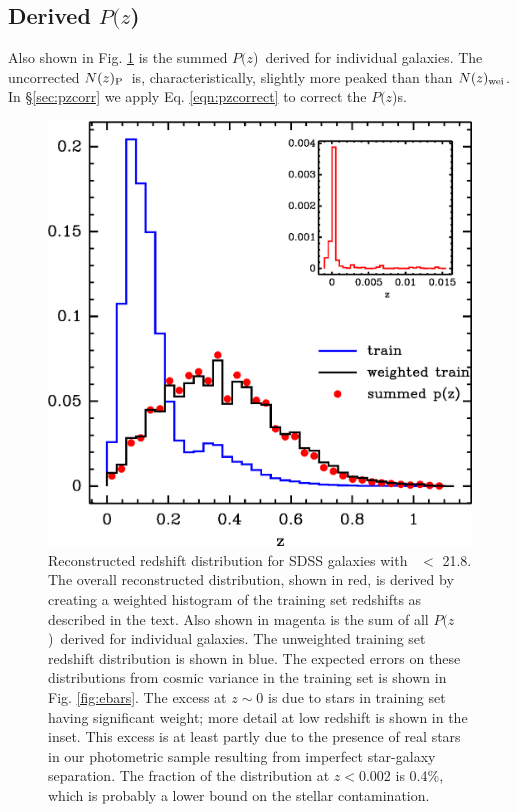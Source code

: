 \documentclass[12pt,preprint]{aastex}
\newcommand{\rmax}{21.8}
\newcommand{\pofz}{$P(z$)}
\newcommand{\nwei}{N(z)_{\rm wei}}
\newcommand{\npz}{N(z)_{\rm P}}
\begin{document}
\subsection{Derived \pofz}

Also shown in Fig. \ref{fig:pofz} is the summed \pofz\ derived for individual
galaxies.  The uncorrected $\npz$\ is, characteristically, slightly more peaked than
than $\nwei$.
In \S \ref{sec:pzcorr} we apply Eq. \ref{eqn:pzcorrect} to correct the \pofz s.

\begin{figure}[p] \centering
    \includegraphics[scale=0.9]{figures/zweight-10-zhist-withorig-withsum-12.eps}

    \caption{Reconstructed redshift distribution for SDSS galaxies with \rmag\
    $ < $ \rmax.  The overall reconstructed distribution, shown in red, is
    derived by creating a weighted histogram of the training set redshifts as
    described in the text.  Also shown in magenta is the sum of all \pofz\
    derived for individual galaxies.  The unweighted training set redshift
    distribution is shown in blue.  The expected errors on these distributions
    from cosmic variance in the training set is shown in Fig.  \ref{fig:ebars}.
    The excess at $z \sim 0$ is due to stars in training set having significant
    weight; more detail at low redshift is shown in the inset.  This excess is
    at least partly due to the presence of real stars in our photometric sample
    resulting from imperfect star-galaxy separation.  The fraction of the
    distribution at $z < 0.002$ is 0.4\%, which is probably a lower bound on
    the stellar contamination.  \label{fig:pofz}}

    \vspace{2em}
\end{figure}
\end{document}
